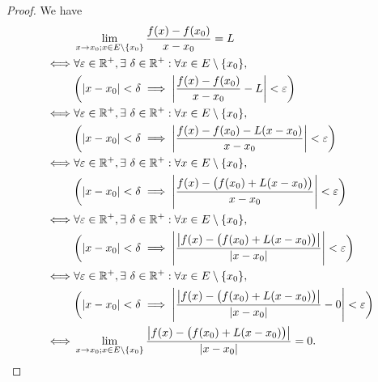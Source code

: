 \begin{proof}
  We have
  \begin{align*}
         & \lim_{x \to x_0 ; x \in E \setminus \{x_0\}} \dfrac{f(x) - f(x_0)}{x - x_0} = L                                                       \\
    \iff & \forall \varepsilon \in \R^+, \exists\ \delta \in \R^+ : \forall x \in E \setminus \{x_0\},                                           \\
         & \bigg(\abs{x - x_0} < \delta \implies \abs{\dfrac{f(x) - f(x_0)}{x - x_0} - L} < \varepsilon\bigg)                                    \\
    \iff & \forall \varepsilon \in \R^+, \exists\ \delta \in \R^+ : \forall x \in E \setminus \{x_0\},                                           \\
         & \bigg(\abs{x - x_0} < \delta \implies \abs{\dfrac{f(x) - f(x_0) - L(x - x_0)}{x - x_0}} < \varepsilon\bigg)                           \\
    \iff & \forall \varepsilon \in \R^+, \exists\ \delta \in \R^+ : \forall x \in E \setminus \{x_0\},                                           \\
         & \bigg(\abs{x - x_0} < \delta \implies \abs{\dfrac{f(x) - \big(f(x_0) + L(x - x_0)\big)}{x - x_0}} < \varepsilon\bigg)                 \\
    \iff & \forall \varepsilon \in \R^+, \exists\ \delta \in \R^+ : \forall x \in E \setminus \{x_0\},                                           \\
         & \bigg(\abs{x - x_0} < \delta \implies \abs{\dfrac{\abs{f(x) - \big(f(x_0) + L(x - x_0)\big)}}{\abs{x - x_0}}} < \varepsilon\bigg)     \\
    \iff & \forall \varepsilon \in \R^+, \exists\ \delta \in \R^+ : \forall x \in E \setminus \{x_0\},                                           \\
         & \bigg(\abs{x - x_0} < \delta \implies \abs{\dfrac{\abs{f(x) - \big(f(x_0) + L(x - x_0)\big)}}{\abs{x - x_0}} - 0} < \varepsilon\bigg) \\
    \iff & \lim_{x \to x_0 ; x \in E \setminus \{x_0\}} \dfrac{\abs{f(x) - \big(f(x_0) + L(x - x_0)\big)}}{\abs{x - x_0}} = 0.
  \end{align*}
\end{proof}

